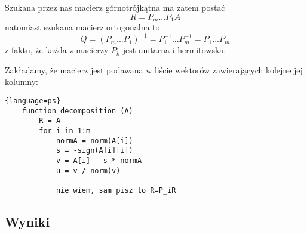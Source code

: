 Szukana przez nas macierz górnotrójkątna ma zatem postać
$$R=P_m...P_1A$$
natomiast szukana macierz ortogonalna to
$$Q=(P_m...P_1)^{-1}=P_1^{-1}...P_m^{-1}=P_1...P_m$$
z faktu, że każda z macierzy $P_k$ jest unitarna i hermitowska.

Zakładamy, że macierz jest podawana w liście wektorów zawierających kolejne jej kolumny:
\begin{lstlisting}{language=ps}
    function decomposition (A)
        R = A
        for i in 1:m
            normA = norm(A[i])
            s = -sign(A[i][i])
            v = A[i] - s * normA
            u = v / norm(v)

            nie wiem, sam pisz to R=P_iR

\end{lstlisting}

\subsection{Wyniki}
